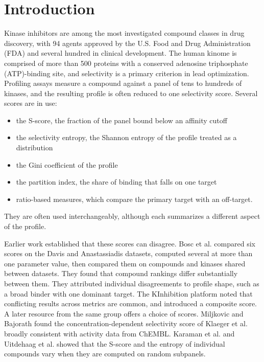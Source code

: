 \section{Introduction}
\label{sec:intro}

Kinase inhibitors are among the most investigated compound classes
in drug discovery, with 94 agents approved by the U.S. Food and Drug
Administration (FDA) and several hundred in
clinical development\cite{Roskoski2026}. The human kinome is comprised of more than
500 proteins with a conserved adenosine triphosphate (ATP)-binding site\cite{Manning2002}, and
selectivity is a primary criterion in lead optimization\cite{Bhullar2018}.
Profiling assays measure a compound against a panel of tens to hundreds of
kinases, and the resulting profile is often reduced to one selectivity score.
Several scores are in use:
\begin{itemize}
  \item the S-score\cite{Karaman2008}, the fraction of the panel bound below an
        affinity cutoff
  \item the selectivity entropy\cite{Uitdehaag2011}, the Shannon entropy of the
        profile treated as a distribution
  \item the Gini coefficient\cite{Graczyk2010} of the profile
  \item the partition index\cite{Cheng2010}, the share of binding that falls on
        one target
  \item ratio-based measures, which compare the primary target with an
        off-target.
\end{itemize}
They are often used interchangeably, although each summarizes a different
aspect of the profile.

Earlier work established that these scores can disagree. Bosc et
al.\cite{Bosc2017} compared six scores on the Davis and Anastassiadis datasets,
computed several at more than one parameter value, then compared them on compounds
and kinases shared between datasets. They found that compound rankings differ
substantially between them. They attributed individual
disagreements to profile shape, such as a broad binder with one dominant
target. The KInhibition platform\cite{KInhibition2018} noted that conflicting
results across metrics are common, and introduced a composite score. A
later resource\cite{Gujral2026} from the same group offers a choice of scores.
Miljkovic and Bajorath\cite{Bajorath2018} found the concentration-dependent
selectivity score of Klaeger et al.\cite{Klaeger2017} broadly consistent with
activity data from ChEMBL. Karaman et al.\cite{Karaman2008} and Uitdehaag et
al.\cite{Uitdehaag2012} showed that the S-score and the entropy of individual
compounds vary when they are computed on random subpanels.

